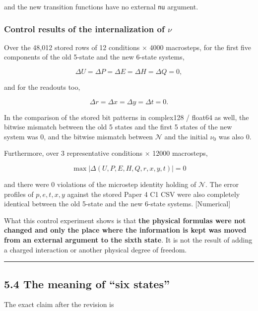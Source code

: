 \documentclass[
  a4paper,
]{article}
\begin{document}
and the new transition functions have no external \texttt{nu} argument.

\subsubsection{\texorpdfstring{Control results of the internalization of
\(\nu\)}{Control results of the internalization of \textbackslash nu}}\label{control-results-of-the-internalization-of-nu}

Over the 48,012 stored rows of 12 conditions \(\times\) 4000 macrosteps,
for the first five components of the old 5-state and the new 6-state
systems,

\[
\boxed{\Delta U=\Delta P=\Delta E=\Delta H=\Delta Q=0},
\]

and for the readouts too,

\[
\boxed{\Delta r=\Delta x=\Delta y=\Delta t=0}.
\]

In the comparison of the stored bit patterns in complex128 / float64 as
well, the bitwise mismatch between the old 5 states and the first 5
states of the new system was 0, and the bitwise mismatch between
\(\mathcal N\) and the initial \(\nu_0\) was also 0.

Furthermore, over 3 representative conditions \(\times\) 12000
macrosteps,

\[
\boxed{
\max|\Delta(U,P,E,H,Q,r,x,y,t)|=0
}
\]

and there were 0 violations of the microstep identity holding of
\(\mathcal N\). The error profiles of \(p,e,t,x,y\) against the stored
Paper 4 C1 CSV were also completely identical between the old 5-state
and the new 6-state systems. {[}Numerical{]}

What this control experiment shows is that \textbf{the physical formulas
were not changed and only the place where the information is kept was
moved from an external argument to the sixth state}. It is not the
result of adding a charged interaction or another physical degree of
freedom.

\begin{center}\rule{0.5\linewidth}{0.5pt}\end{center}

\subsection{5.4 The meaning of ``six
states''}\label{the-meaning-of-six-states}

The exact claim after the revision is
\end{document}

